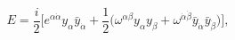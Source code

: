 \begin{equation}
E = \frac{i}2 \bigg[ e^{\alpha\dot\alpha} y_\alpha \bar y_{\dot\alpha} +
   \frac12 \Big( \omega^{\alpha\beta} y_\alpha y_\beta +
 \omega^{\dot\alpha\dot\beta} 
        \bar y_{\dot\alpha}\bar y_{\dot\beta} \Big) \bigg],
\label{eq:usefull2}
\end{equation}

